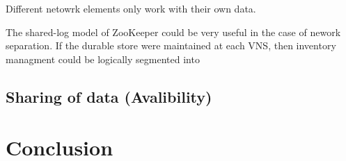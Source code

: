 \documentclass[letterpaper,twocolumn,10pt]{article}
\begin{document}
 Different netowrk elements only work with their own data.

 The shared-log model of ZooKeeper could be very useful in the case of nework separation. If the durable store were maintained at each VNS, then inventory managment could be logically segmented into 

% 
% 
% 
% 
% 
% 
% 

\subsection{Sharing of data (Avalibility)}

\section{Conclusion}



\end{document}
